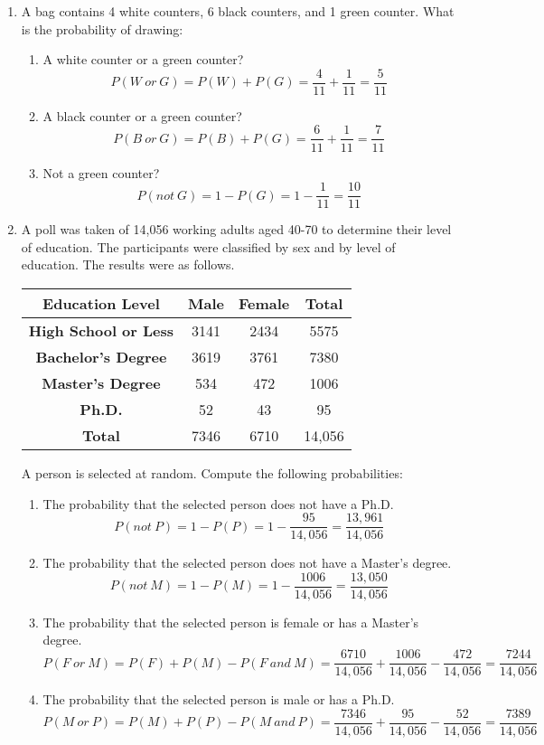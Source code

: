 \begin{enumerate}
\item A bag contains 4 white counters, 6 black counters, and 1 green counter. What is the
probability of drawing:
\begin{enumerate}
\item A white counter or a green counter? 
\[P(W\ or\ G) = P(W) + P(G) = \dfrac{4}{11} + \dfrac{1}{11} = \dfrac{5}{11}\]
\item A black counter or a green counter? 
\[P(B\ or\ G) = P(B) + P(G) = \dfrac{6}{11} + \dfrac{1}{11} = \dfrac{7}{11}\]
\item Not a green counter? 
\[P(not\ G) = 1 - P(G) = 1 - \dfrac{1}{11} = \dfrac{10}{11}\]
\end{enumerate}

\item  A poll was taken of 14,056 working adults aged 40-70 to determine their level of
education. The participants were classified by sex and by level of education. The results
were as follows.
\begin{center}
\begin{tabular}{c|cc|c}
\textbf{Education Level}     &  \textbf{Male} &  \textbf{Female} &  \textbf{Total} \\ \hline
\textbf{High School or Less} & 3141  &2434     &  5575  \\ 
\textbf{Bachelor's Degree}   & 3619  &3761     &  7380  \\
\textbf{Master's Degree}     & 534   &472      &  1006  \\
\textbf{Ph.D.}               & 52    &43       &  95    \\ \hline
\textbf{Total} 							& 7346  &6710     & 14,056 \\ 
\end{tabular}
\end{center}
A person is selected at random. Compute the following probabilities:
\begin{enumerate}
\item The probability that the selected person does not have a Ph.D. 
\[P(not\ P) = 1 - P(P) = 1 - \dfrac{95}{14,056} = \dfrac{13,961}{14,056}\]
\item The probability that the selected person does not have a Master's degree. 
\[P(not\ M) = 1 - P(M) = 1 - \dfrac{1006}{14,056} = \dfrac{13,050}{14,056}\]
\item The probability that the selected person is female or has a Master's degree. 
\[P(F\ or\ M) = P(F) + P(M) - P(F\ and\ M) = \dfrac{6710}{14,056} + \dfrac{1006}{14,056} - \dfrac{472}{14,056} = \dfrac{7244}{14,056}\]
\item The probability that the selected person is male or has a Ph.D. 
\[P(M\ or\ P) = P(M) + P(P) - P(M\ and\ P) = \dfrac{7346}{14,056} + \dfrac{95}{14,056} - \dfrac{52}{14,056} = \dfrac{7389}{14,056}\]
\end{enumerate}
\end{enumerate}